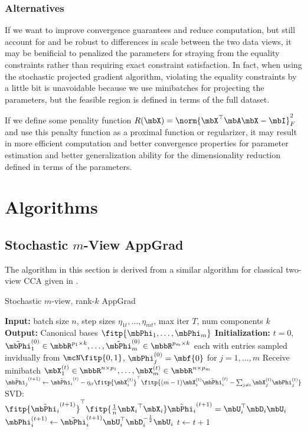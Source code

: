 \documentclass{article}
\begin{document}
	\subsubsection{Alternatives} \label{subsubsec:alternatives}
	If we want to improve convergence guarantees and reduce computation, but still account for and be robust to differences in scale between the two data views, it may be benificial to penalized the parameters for straying from the equality constraints rather than requiring exact constraint satisfaction. In fact, when using the stochastic projected gradient algorithm, violating the equality constraints by a little bit is unavoidable because we use minibatches for projecting the parameters, but the feasible region is defined in terms of the full dataset.
	
	If we define some penality function $R(\mbX) = \norm{\mbX^{\top}\mbA\mbX - \mbI}_F^2$ and use this penalty function as a proximal function or regularizer, it may result in more efficient computation and better convergence properties for parameter estimation and better generalization ability for the dimensionality reduction defined in terms of the parameters.
	
\section{Algorithms} \label{sec:alg}

	\subsection{Stochastic $m$-View AppGrad} \label{subsec:appgrad}
	
	The algorithm in this section is derived from a similar algorithm for classical two-view CCA given in \cite{ma2015finding}.
	
	\begin{algorithm}
	\caption{Stochastic $m$-view, rank-$k$ AppGrad} \label{alg:stochappgrad}
	\begin{algorithmic}[1]
		\STATE \textbf{Input:} batch size $n$, step sizes $\eta_{1t},\ldots,\eta_{mt}$, max iter $T$, num components $k$
		\STATE \textbf{Output:} Canonical bases $\fitp{\mbPhi_1, \ldots, \mbPhi_m}$
		\STATE \textbf{Initialization:} $t=0$, $\tilde{\mbPhi}_1^{(0)} \in \mbbR^{p_1 \times k}, \ldots, \tilde{\mbPhi}_m^{(0)} \in \mbbR^{p_m \times k}$ each with entries sampled invidually from $\mcN \fitp{0,1}$, $\mbPhi_j^{(0)} = \mbf{0}$ for $j = 1,\ldots,m$
		\STATE Receive minibatch $\mbX_1^{(t)} \in \mbbR^{n \times p_1}, \ldots, \mbX_m^{(t)} \in \mbbR^{n \times p_m}$
		\STATE $\tilde{\mbPhi_j}^{(t+1)} \leftarrow \tilde{\mbPhi_i}^{(t)} - \eta_{it}\fitp{\mbX_i^{(t)}}^{\top}\fitp{(m-1)\mbX_i^{(t)}\tilde{\mbPhi}_i^{(t)} - \sum_{j \neq i}\mbX_j^{(t)}\mbPhi_j^{(t)}}$
		\STATE SVD: $\fitp{\tilde{\mbPhi_i}^{(t+1)}}^{\top} \fitp{\frac{1}{n} {\mbX_i}^{\top}\mbX_i}\tilde{\mbPhi_i}^{(t+1)} = \mbU_i^{\top}\mbD_i\mbU_i$
		\STATE $\mbPhi_i^{(t+1)} \leftarrow \tilde{\mbPhi}_i^{(t+1)}\mbU_i^{\top}\mbD_i^{-\frac{1}{2}}\mbU_i$
		\ENDFOR
		\STATE $t \leftarrow t+1$
		\ENDWHILE
	\end{algorithmic}
	\end{algorithm}
	
\end{document}
